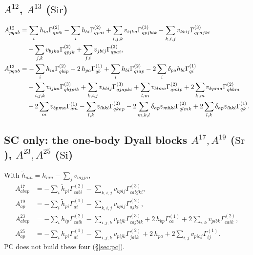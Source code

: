 \documentclass[11pt]{article}
\newcommand{\G}[1]{\Gamma^{(#1)}}
\newcommand{\cls}[1]{\ensuremath{\mathrm{#1}}}
\begin{document}
\subsection{\texorpdfstring{$A^{12}$, $A^{13}$ (\cls{Sir})}{A12, A13 (Sir)}}
\begin{align}
A^{12}_{pqab} &= \sum_{i} h_{ia}\G2_{qpib} - \sum_{i} h_{bi}\G2_{qpai}
   + \sum_{i,j,k} v_{ijka}\G3_{qpjbik} - \sum_{k,i,j} v_{kbij}\G3_{qpajki} \notag\\
 &\quad - \sum_{j,k} v_{bjka}\G2_{qpjk} + \sum_{j,i} v_{jbij}\G2_{qpai}, \\
A^{13}_{pqab} &= -\sum_{i} h_{ia}\G2_{qbip} + 2\,h_{pa}\G1_{qb}
   + \sum_{i} h_{bi}\G2_{qiap} - 2\sum_{i}\delta_{pa}h_{bi}\G1_{qi} \notag\\
 &\quad - \sum_{i,j,k} v_{ijka}\G3_{qbjpik} + \sum_{k,i,j} v_{kbij}\G3_{qjapki}
   + \sum_{l,m} v_{blma}\G2_{qmlp} + 2\sum_{k,m} v_{kpma}\G2_{qbkm} \notag\\
 &\quad - 2\sum_{m} v_{bpma}\G1_{qm} - \sum_{l,k} v_{lbkl}\G2_{qkap}
   - 2\sum_{m,k,l}\delta_{ap}v_{mbkl}\G2_{qlmk} + 2\sum_{l,k}\delta_{ap}v_{lbkl}\G1_{qk}.
\end{align}

\subsection{\texorpdfstring{SC only: the one-body Dyall blocks $A^{17}, A^{19}$ (\cls{Sr}), $A^{23}, A^{25}$ (\cls{Si})}{SC only: the one-body Dyall blocks A17, A19 (Sr), A23, A25 (Si)}}
With $\tilde h_{mn} = h_{mn} - \sum_j v_{mjjn}$,
\begin{align}
A^{17}_{abcp} &= -\sum_{i} \tilde h_{pi}\G2_{cabi} - \sum_{k,i,j} v_{kpij}\G3_{cabjki}, \\
A^{19}_{ap} &= -\sum_{i} \tilde h_{pi}\G1_{ai} - \sum_{k,i,j} v_{kpij}\G2_{ajki}, \\
A^{23}_{abcp} &= -\sum_{i} h_{ip}\G2_{caib} - \sum_{i,j,k} v_{pijk}\G3_{cajbik}
   + 2\,h_{bp}\G1_{ca} + 2\sum_{i,k} v_{pibk}\G2_{caik}, \\
A^{25}_{ap} &= -\sum_{i} h_{pi}\G1_{ai} - \sum_{i,j,k} v_{pijk}\G2_{jaik}
   + 2\,h_{pa} + 2\sum_{i,j} v_{piaj}\G1_{ij}.
\end{align}
PC does not build these four (\S\ref{sec:pc}).
\end{document}
